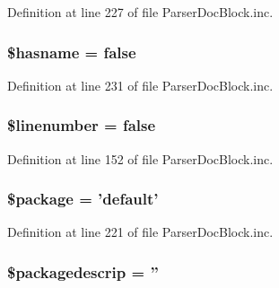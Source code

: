 \-Definition at line 227 of file \-Parser\-Doc\-Block.\-inc.

\hypertarget{classparser_doc_block_a74b1a80b36f9905d5e36a5987d9fe96b}{
\subsubsection[{\$hasname}]{\setlength{\rightskip}{0pt plus 5cm}\$hasname = false}}\label{classparser_doc_block_a74b1a80b36f9905d5e36a5987d9fe96b}


\-Definition at line 231 of file \-Parser\-Doc\-Block.\-inc.

\hypertarget{classparser_doc_block_ab6068db00e5a532a6c7211da1897185b}{
\subsubsection[{\$linenumber}]{\setlength{\rightskip}{0pt plus 5cm}\$linenumber = false}}\label{classparser_doc_block_ab6068db00e5a532a6c7211da1897185b}


\-Definition at line 152 of file \-Parser\-Doc\-Block.\-inc.

\hypertarget{classparser_doc_block_a365395516cc195292e97e09bc0d165ae}{
\subsubsection[{\$package}]{\setlength{\rightskip}{0pt plus 5cm}\$package = 'default'}}\label{classparser_doc_block_a365395516cc195292e97e09bc0d165ae}


\-Definition at line 221 of file \-Parser\-Doc\-Block.\-inc.

\hypertarget{classparser_doc_block_ab7b59d5a21e382623175468f56669f16}{
\subsubsection[{\$packagedescrip}]{\setlength{\rightskip}{0pt plus 5cm}\$packagedescrip = ''}}\label{classparser_doc_block_ab7b59d5a21e382623175468f56669f16}


